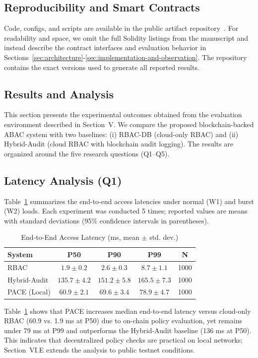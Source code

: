 \documentclass[pdflatex,sn-mathphys-num]{sn-jnl}
\begin{document}
\subsection{Reproducibility and Smart Contracts}
Code, configs, and scripts are available in the public artifact repository~\cite{pace-repo}.
For readability and space, we omit the full Solidity listings from the manuscript and instead describe the contract interfaces and evaluation behavior in Sections~\ref{sec:architecture}-\ref{sec:implementation-and-observation}. The repository contains the exact versions used to generate all reported results.




\subsection{Results and Analysis}

This section presents the experimental outcomes obtained from the evaluation
environment described in Section~V. We compare the proposed blockchain-backed
ABAC system with two baselines: (i) RBAC-DB (cloud-only RBAC) and
(ii) Hybrid-Audit (cloud RBAC with blockchain audit logging). The results are
organized around the five research questions (Q1--Q5).

\subsection{Latency Analysis (Q1)}
Table~\ref{tab:latency} summarizes the end-to-end access latencies under normal
(W1) and burst (W2) loads. Each experiment was conducted 5 times; reported values are
means with standard deviations (95\% confidence intervals in parentheses).
\begin{table}[!htbp]
	\centering
	\caption{End-to-End Access Latency (ms, mean $\pm$ std. dev.)}
	\begin{tabularx}{\columnwidth}{X c c c c}
		\toprule
		\textbf{System}        & \textbf{P50}    & \textbf{P90}    & \textbf{P99}    & \textbf{N} \\
		\midrule
		RBAC                   & $1.9 \pm 0.2$   & $2.6 \pm 0.3$   & $8.7 \pm 1.1$   & 1000       \\
		Hybrid-Audit           & $135.7 \pm 4.2$ & $151.2 \pm 5.8$ & $165.5 \pm 7.3$ & 1000       \\
		PACE (Local)     & $60.9 \pm 2.1$  & $69.6 \pm 3.4$  & $78.9 \pm 4.7$  & 1000       \\
		\bottomrule
	\end{tabularx}
	\label{tab:latency}
\end{table}
Table~\ref{tab:latency} shows that PACE increases median end-to-end latency versus cloud-only RBAC (60.9 vs.
1.9 ms at P50) due to on-chain policy evaluation, yet remains under 79 ms at P99 and outperforms the Hybrid-Audit baseline (136 ms at P50). This indicates that decentralized policy checks are practical on local networks; Section~VI.E extends the analysis to public testnet conditions.
\end{document}
